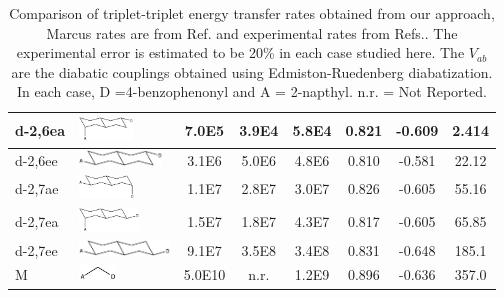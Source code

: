 \begin{table}[t]
\begin{centering}
\begin{tabular}{llccc|ccc}
\hline
d-2,6ea  &  \includegraphics[height=0.6cm]{Chapters/chap2/Table1-d26ea.pdf}  &                     7.0E5  &                     3.9E4  &          5.8E4  &            0.821  &            -0.609  &    2.414  \\
\hline
 d-2,6ee  &  \includegraphics[height=0.4cm]{Chapters/chap2/Table1-d26ee.pdf}  &                     3.1E6  &                     5.0E6  &          4.8E6  &           0.810  &           -0.581  &     22.12  \\
\hline
 d-2,7ae  &  \includegraphics[height=0.6cm]{Chapters/chap2/Table1-d27ae.pdf}  &                     1.1E7  &                     2.8E7  &          3.0E7  &           0.826  &           -0.605  &     55.16   \\
\hline
 d-2,7ea  &  \includegraphics[height=0.6cm]{Chapters/chap2/Table1-d27ea.pdf}  &                     1.5E7  &                     1.8E7  &          4.3E7  &           0.817  &           -0.605  &     65.85  \\
\hline
 d-2,7ee  &  \includegraphics[height=0.4cm]{Chapters/chap2/Table1-d27ee.pdf}  &                     9.1E7  &                     3.5E8  &          3.4E8  &           0.831  &           -0.648  &     185.1  \\
\hline
 M        &  \includegraphics[height=0.4cm]{Chapters/chap2/Table1-M.pdf}      &                    5.0E10  &                      n.r.  &          1.2E9  &       	   0.896  &		 -0.636  &      357.0 \\
\hline
\end{tabular}

\par\end{centering}
\caption{Comparison of triplet-triplet energy transfer rates obtained from our  approach,  Marcus rates are
from Ref.\cite{Subotnik:2010}
and experimental rates from Refs.\cite{closs1988determination,closs1989connection}.   The experimental error is estimated to be 20\% in each
case studied here.
The $V_{ab}$ are the diabatic couplings obtained using  Edmiston-Ruedenberg diabatization.
In each case, D =4-benzophenonyl and A = 2-napthyl.  n.r. = Not Reported.
}
\label{summarytable}
\end{table}





